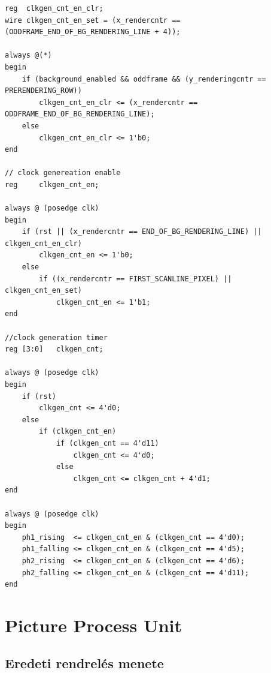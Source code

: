 \begin{lstlisting}[style=prettyverilog]
reg  clkgen_cnt_en_clr;
wire clkgen_cnt_en_set = (x_rendercntr == (ODDFRAME_END_OF_BG_RENDERING_LINE + 4));

always @(*) 
begin
	if (background_enabled && oddframe && (y_renderingcntr == PRERENDERING_ROW))
		clkgen_cnt_en_clr <= (x_rendercntr == ODDFRAME_END_OF_BG_RENDERING_LINE);
	else
		clkgen_cnt_en_clr <= 1'b0;	
end

// clock genereation enable
reg		clkgen_cnt_en;

always @ (posedge clk)
begin
	if (rst || (x_rendercntr == END_OF_BG_RENDERING_LINE) || clkgen_cnt_en_clr)
		clkgen_cnt_en <= 1'b0;
	else
		if ((x_rendercntr == FIRST_SCANLINE_PIXEL) || clkgen_cnt_en_set)
			clkgen_cnt_en <= 1'b1;
end	

//clock generation timer
reg	[3:0]	clkgen_cnt;

always @ (posedge clk)
begin
	if (rst)
		clkgen_cnt <= 4'd0;
	else
		if (clkgen_cnt_en)
			if (clkgen_cnt == 4'd11)
				clkgen_cnt <= 4'd0;
			else
				clkgen_cnt <= clkgen_cnt + 4'd1;
end

always @ (posedge clk)
begin
	ph1_rising	<= clkgen_cnt_en & (clkgen_cnt == 4'd0);
	ph1_falling <= clkgen_cnt_en & (clkgen_cnt == 4'd5);
	ph2_rising	<= clkgen_cnt_en & (clkgen_cnt == 4'd6);
	ph2_falling <= clkgen_cnt_en & (clkgen_cnt == 4'd11);
end\end{lstlisting}

\section{Picture Process Unit}
\label{sec:PPU-FPGA}

	\subsection{Eredeti rendrelés menete}
	
